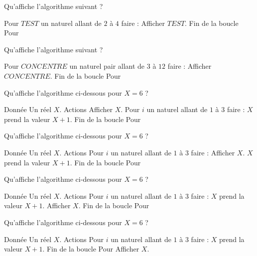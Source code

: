 \begin{multicols}{2}
    \algoname{}
    Qu'affiche l'algorithme suivant ?
    \bigskip
    \begin{myverb}
Pour \(TEST\) un naturel allant de \(2\) 
à \(4\) faire :
    Afficher \(TEST\).
Fin de la boucle Pour
    \end{myverb}

    \switchcol

    \algoname{}
    Qu'affiche l'algorithme suivant ?
    \bigskip
    \begin{myverb}
Pour \(CONCENTRE\) un naturel pair allant
de \(3\) à \(12\) faire :
    Afficher \(CONCENTRE\).
Fin de la boucle Pour
    \end{myverb}
\end{multicols}

\algorule

\begin{multicols}{2}
    \algoname{}
    Qu'affiche l'algorithme ci-dessous pour $X=6$ ?
    \bigskip
    \begin{myverb}
Donnée
    Un réel \(X\).
Actions
    Afficher \(X\).
    Pour \(i\) un naturel allant de \(1\) à \(3\) faire :
        \(X\) prend la valeur \(X+1\).
    Fin de la boucle Pour
    \end{myverb}

    \switchcol

    \algoname{}
    Qu'affiche l'algorithme ci-dessous pour $X=6$ ?
    \bigskip
    \begin{myverb}
Donnée
    Un réel \(X\).
Actions
    Pour \(i\) un naturel allant de \(1\) à \(3\) faire :
        Afficher \(X\).
        \(X\) prend la valeur \(X+1\).
    Fin de la boucle Pour
    \end{myverb}
\end{multicols}

\algorule

\begin{multicols}{2}
    \algoname{}
    Qu'affiche l'algorithme ci-dessous pour $X=6$ ?
    \bigskip
    \begin{myverb}
Donnée
    Un réel \(X\).
Actions
    Pour \(i\) un naturel allant de \(1\) à \(3\) faire :
        \(X\) prend la valeur \(X+1\).
        Afficher \(X\).
    Fin de la boucle Pour
    \end{myverb}

    \switchcol

    \algoname{}
    Qu'affiche l'algorithme ci-dessous pour $X=6$ ?
    \bigskip
    \begin{myverb}
Donnée
    Un réel \(X\).
Actions
    Pour \(i\) un naturel allant de \(1\) à \(3\) faire :
        \(X\) prend la valeur \(X+1\).
    Fin de la boucle Pour
    Afficher \(X\).
    \end{myverb}
\end{multicols}

